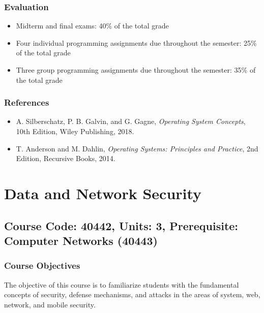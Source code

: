 \documentclass[12pt]{article}
\begin{document}
\subsubsection*{Evaluation}
\begin{itemize}
    \item Midterm and final exams: 40\% of the total grade
    \item Four individual programming assignments due throughout the semester: 25\% of the total grade
    \item Three group programming assignments due throughout the semester: 35\% of the total grade
\end{itemize}

\subsubsection*{References}
\begin{itemize}
    \item A. Silberschatz, P. B. Galvin, and G. Gagne, \textit{Operating System Concepts}, 10th Edition, Wiley Publishing, 2018.
    \item T. Anderson and M. Dahlin, \textit{Operating Systems: Principles and Practice}, 2nd Edition, Recursive Books, 2014.
\end{itemize}

\newpage

\section{Data and Network Security}
\subsection*{Course Code: 40442, Units: 3, Prerequisite: Computer Networks (40443)}

\subsubsection*{Course Objectives}
The objective of this course is to familiarize students with the fundamental concepts of security, defense mechanisms, and attacks in the areas of system, web, network, and mobile security.
\end{document}
